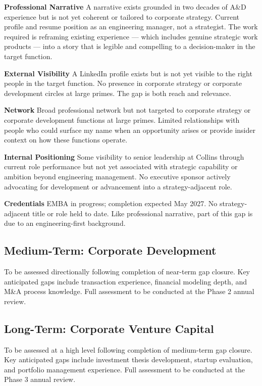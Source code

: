 \documentclass{article}
\begin{document}
\textbf{Professional Narrative}
A narrative exists grounded in two decades of A\&D experience but is not yet coherent or tailored to corporate strategy. Current
profile and resume position as an engineering manager, not a strategist. The work required is reframing existing experience ---
which includes genuine strategic work products --- into a story that is legible and compelling to a decision-maker in the target function.

\textbf{External Visibility}
A LinkedIn profile exists but is not yet visible to the right people in the target function. No presence in corporate strategy or
corporate development circles at large primes. The gap is both reach and relevance.

\textbf{Network}
Broad professional network but not targeted to corporate strategy or corporate development functions at large primes. Limited
relationships with people who could surface my name when an opportunity arises or provide insider context on how these functions operate.

\textbf{Internal Positioning}
Some visibility to senior leadership at Collins through current role performance but not yet associated with strategic capability or
ambition beyond engineering management. No executive sponsor actively advocating for development or advancement into a strategy-adjacent role.

\textbf{Credentials}
EMBA in progress; completion expected May 2027. No strategy-adjacent title or role held to date. Like professional 
narrative, part of this gap is due to an engineering-first background.

\subsection{Medium-Term: Corporate Development}

To be assessed directionally following completion of near-term gap closure. Key anticipated gaps include transaction experience,
financial modeling depth, and M\&A process knowledge. Full assessment to be conducted at the Phase 2 annual review.

\subsection{Long-Term: Corporate Venture Capital}

To be assessed at a high level following completion of medium-term gap closure. Key anticipated gaps include investment thesis
development, startup evaluation, and portfolio management experience. Full assessment to be conducted at the Phase 3 annual review.
\end{document}
